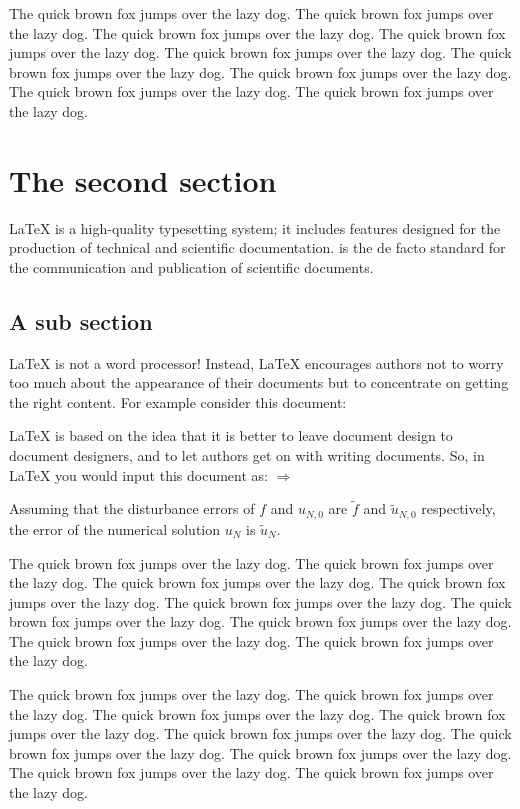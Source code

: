 \documentclass[openany,twoside,12pt]{book}
\theoremstyle{plain}
\numberwithin{equation}{chapter}
\numberwithin{figure}{chapter}
\numberwithin{table}{chapter}
\begin{document}
The quick brown fox jumps over the lazy dog. The quick brown fox jumps over the lazy dog. The quick brown fox jumps over the lazy dog. The quick brown fox jumps over the lazy dog. The quick brown fox jumps over the lazy dog. The quick brown fox jumps over the lazy dog. The quick brown fox jumps over the lazy dog. The quick brown fox jumps over the lazy dog. The quick brown fox jumps over the lazy dog.


\section{The second section}
LaTeX is a high-quality typesetting system; it includes features designed for the production of technical and scientific documentation.  is the de facto standard for the communication and publication of scientific documents.

\subsection{A sub section}
LaTeX is not a word processor! Instead, LaTeX encourages authors not to worry too much about the appearance of their documents but to concentrate on getting the right content. For example consider this document:

LaTeX is based on the idea that it is better to leave document design to document designers, and to let authors get on with writing documents. So, in LaTeX you would input this document as:
$ \Rightarrow $

Assuming that the disturbance errors of $f$ and $u_{N,0}$ are $\tilde{f}$ and $\tilde{u}_{N,0}$ respectively, the error of the numerical solution $u_N$ is $\tilde{u}_N$.


The quick brown fox jumps over the lazy dog. The quick brown fox jumps over the lazy dog. The quick brown fox jumps over the lazy dog. The quick brown fox jumps over the lazy dog. The quick brown fox jumps over the lazy dog. The quick brown fox jumps over the lazy dog. The quick brown fox jumps over the lazy dog. The quick brown fox jumps over the lazy dog. The quick brown fox jumps over the lazy dog.


The quick brown fox jumps over the lazy dog. The quick brown fox jumps over the lazy dog. The quick brown fox jumps over the lazy dog. The quick brown fox jumps over the lazy dog. The quick brown fox jumps over the lazy dog. The quick brown fox jumps over the lazy dog. The quick brown fox jumps over the lazy dog. The quick brown fox jumps over the lazy dog. The quick brown fox jumps over the lazy dog.
\end{document}
